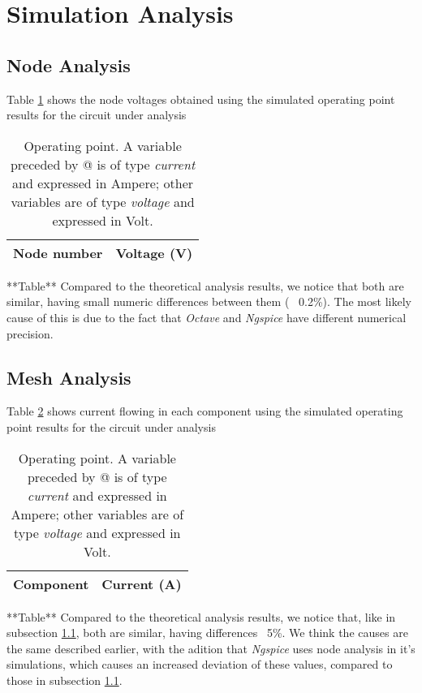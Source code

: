 \section{Simulation Analysis}
\label{sec:simulation}

\subsection{Node Analysis}
\label{subsec:node_sim}

Table \ref{tab:node_sim} shows the node voltages obtained using the simulated operating point results for the circuit under analysis
\begin{table}[h]
  \centering
  \begin{tabular}{|l|r|}
    \hline    
    {\bf Node number} & {\bf Voltage (V)} \\ \hline
    
  \end{tabular}
  \caption{Operating point. A variable preceded by @ is of type {\em current}
    and expressed in Ampere; other variables are of type {\it voltage} and expressed in
    Volt.}
  \label{tab:node_sim}
\end{table}
**Table**
Compared to the theoretical analysis results, we notice that both are similar, having small numeric differences between them (~ 0.2\%). The most likely cause of this is due to the fact that \textit{Octave} and \textit{Ngspice} have different numerical precision.

\subsection{Mesh Analysis}

Table \ref{tab:mesh_sim} shows current flowing in each component using the simulated operating point results for the circuit under analysis
\begin{table}[h]
  \centering
  \begin{tabular}{|l|r|}
    \hline    
    {\bf Component} & {\bf Current (A)} \\ \hline
    
  \end{tabular}
  \caption{Operating point. A variable preceded by @ is of type {\em current}
    and expressed in Ampere; other variables are of type {\it voltage} and expressed in
    Volt.}
  \label{tab:mesh_sim}
\end{table}
**Table**
Compared to the theoretical analysis results, we notice that, like in subsection \ref{subsec:node_sim}, both are similar, having differences ~5\%. We think the causes are the same described earlier, with the adition that \textit{Ngspice} uses node analysis in it's simulations, which causes an increased deviation of these values, compared to those in subsection \ref{subsec:node_sim}.


